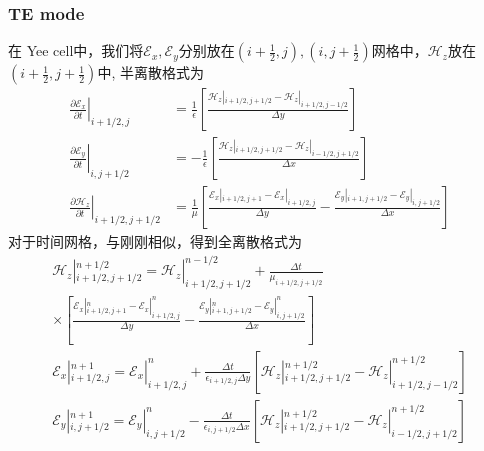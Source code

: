 \documentclass{article}
\newcommand{\nobracket}{}
\begin{document}
\begin{CJK*}{UTF8}{gbsn}
\subsubsection{TE mode}

在 Yee cell中，我们将$\mathscr{E}_x, \mathscr{E}_y$分别放在$\left( i
+ \frac{1}{2}, j \right), \left( i, j + \frac{1}{2}
\right)$网格中，$\mathscr{H}_z$放在$\left( i + \frac{1}{2}, j +
\frac{1}{2} \right)$中, 半离散格式为
\[ \begin{aligned}
     \left. \frac{\partial \mathscr{E}_x}{\partial t} \right|_{i + 1 / 2, j} &
     = \frac{1}{\epsilon} \left[ \frac{\nobracket \mathscr{H}_z |_{i + 1 / 2,
     j + 1 / 2} - \nobracket \mathscr{H}_z |_{i + 1 / 2, j - 1 / 2}}{\Delta y}
     \right]\\
     \left. \frac{\partial \mathscr{E}_y}{\partial t} \right|_{i, j + 1 / 2} &
     = - \frac{1}{\epsilon} \left[ \frac{\nobracket \mathscr{H}_z |_{i + 1 /
     2, j + 1 / 2} - \nobracket \mathscr{H}_z |_{i - 1 / 2, j + 1 / 2}}{\Delta
     x} \right]\\
     \left. \frac{\partial \mathscr{H}_z}{\partial t} \right|_{i + 1 / 2, j +
     1 / 2} & = \frac{1}{\mu}  \left[ \frac{\nobracket \mathscr{E}_x |_{i + 1
     / 2, j + 1} - \nobracket \mathscr{E}_x |_{i + 1 / 2, j}}{\Delta y} -
     \frac{\nobracket \mathscr{E}_y |_{i + 1, j + 1 / 2} - \nobracket
     \mathscr{E}_y |_{i, j + 1 / 2}}{\Delta x} \right]
   \end{aligned} \]
对于时间网格，与刚刚相似，得到全离散格式为
\[ \begin{array}{l}
     \nobracket \mathscr{H}_z |_{i + 1 / 2, j + 1 / 2}^{n + 1 / 2} =
     \nobracket \mathscr{H}_z |_{i + 1 / 2, j + 1 / 2}^{n - 1 / 2} +
     \frac{\Delta t}{\mu_{i + 1 / 2, j + 1 / 2}}\\
     \times \left[ \frac{\nobracket \mathscr{E}_x |_{i + 1 / 2, j + 1}^n -
     \nobracket \mathscr{E}_x |_{i + 1 / 2, j}^n}{\Delta y} - \frac{\nobracket
     \mathscr{E}_y |_{i + 1, j + 1 / 2}^n - \nobracket \mathscr{E}_y |_{i, j +
     1 / 2}^n}{\Delta x} \right]\\
     \nobracket \mathscr{E}_x |_{i + 1 / 2, j}^{n + 1} = \nobracket
     \mathscr{E}_x |_{i + 1 / 2, j}^n + \frac{\Delta t}{\epsilon_{i + 1 / 2,
     j} \Delta y}  [\nobracket \mathscr{H}_z |_{i + 1 / 2, j + 1 / 2}^{n + 1 /
     2} - \nobracket \mathscr{H}_z |_{i + 1 / 2, j - 1 / 2}^{n + 1 / 2}]\\
     \nobracket \mathscr{E}_y |_{i, j + 1 / 2}^{n + 1} = \nobracket
     \mathscr{E}_y |_{i, j + 1 / 2}^n - \frac{\Delta t}{\epsilon_{i, j + 1 /
     2} \Delta x}  [\nobracket \mathscr{H}_z |_{i + 1 / 2, j + 1 / 2}^{n + 1 /
     2} - \nobracket \mathscr{H}_z |_{i - 1 / 2, j + 1 / 2}^{n + 1 / 2}]
   \end{array} \]


\end{CJK*}
\end{document}
